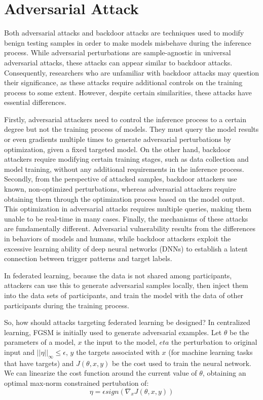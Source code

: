 \documentclass[conference]{IEEEtran}
\begin{document}
\section{Adversarial Attack}  

Both adversarial attacks and backdoor attacks are techniques used to modify benign testing samples
in order to make models misbehave during the inference process. While adversarial perturbations are sample-agnostic in universal adversarial attacks,
these attacks can appear similar to backdoor attacks. Consequently, researchers who are unfamiliar with backdoor attacks may question their significance,
as these attacks require additional controls on the training process to some extent.
However, despite certain similarities, these attacks have essential differences.

Firstly, adversarial attackers need to control the inference process to a certain degree
but not the training process of models. They must query the model results or even gradients multiple
times to generate adversarial perturbations by optimization, given a fixed targeted model.
On the other hand, backdoor attackers require modifying certain training stages,
such as data collection and model training, without any additional requirements in the inference process.
Secondly, from the perspective of attacked samples, backdoor attackers use known,
non-optimized perturbations, whereas adversarial attackers require obtaining
them through the optimization process based on the model output.
This optimization in adversarial attacks requires multiple queries,
making them unable to be real-time in many cases.
Finally, the mechanisms of these attacks are fundamentally different.
Adversarial vulnerability results from the differences in behaviors of models and humans,
while backdoor attackers exploit the excessive learning ability of deep neural networks (DNNs)
to establish a latent connection between trigger patterns and target labels.

In federated learning, because the data is not shared among participants,
attackers can use this to generate adversarial samples locally,
then inject them into the data sets of participants, and train
the model with the data of other participants during the training process.

So, how should attacks targeting federated learning be designed?
In centralized learning, FGSM\cite{b99} is initially used to generate adversarial examples.
Let $\theta$ be the parameters of a model, $x$ the input to the model,
$eta$ the perturbation to original input and $||\eta||_\infty \le \epsilon$,
$y$ the targets associated with $x$ (for machine learning tasks that have targets)
and $J(\theta, x, y)$ be the cost used to train the neural network.
We can linearize the cost function around the current value of $\theta$,
obtaining an optimal max-norm constrained pertubation of:
\begin{equation}
    \eta = \epsilon sign(\nabla_x J(\theta,x,y))
\end{equation}
\end{document}
